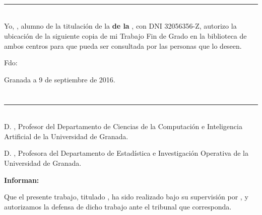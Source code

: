 \\



\chapter*{}
\thispagestyle{empty}

\noindent\rule[-1ex]{\textwidth}{2pt}\\[4.5ex]

Yo, \textbf{\myName}, alumno de la titulación \myDegree de la \textbf{\myFaculty de la \myUni}, con DNI 32056356-Z, autorizo la
ubicación de la siguiente copia de mi Trabajo Fin de Grado en la biblioteca de ambos centros para que pueda ser
consultada por las personas que lo deseen.

\vspace{6cm}

\noindent Fdo: \myName

\vspace{2cm}

\begin{flushright}
Granada a 9 de septiembre de 2016.
\end{flushright}


\chapter*{}
\thispagestyle{empty}

\noindent\rule[-1ex]{\textwidth}{2pt}\\[4.5ex]

D. \textbf{ \myProf }, Profesor del Departamento de Ciencias de la Computación e Inteligencia Artificial de la Universidad de Granada.

\vspace{0.5cm}

D. \textbf{ \myOtherProf}, Profesora del Departamento de Estadística e Investigación Operativa de la Universidad de Granada.


\vspace{0.5cm}

\textbf{Informan:}

\vspace{0.5cm}

Que el presente trabajo, titulado \textit{\textbf{\myTitle}},
ha sido realizado bajo su supervisión por \textbf{\myName}, y autorizamos la defensa de dicho trabajo ante el tribunal
que corresponda.

